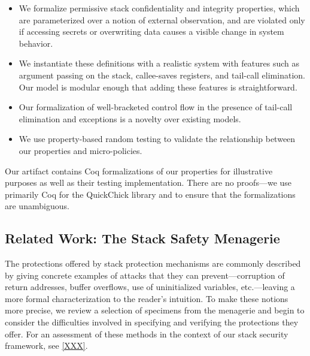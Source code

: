 \begin{itemize}
\item We formalize permissive stack confidentiality and integrity properties,
  which are parameterized over a notion of external
  observation, and are violated only if accessing secrets or overwriting
  data causes a visible change in system behavior.
\item We instantiate these definitions with a realistic
  system with features such as argument passing
  on the stack, callee-saves registers, and tail-call elimination.
  Our model is modular enough that adding these features is straightforward.
\item Our formalization of well-bracketed control flow in the presence of tail-call
  elimination \ifexceptions and exceptions \fi is a novelty over existing models.
\item We use property-based random testing to validate the relationship between
  our properties and micro-policies.
\end{itemize}

Our artifact contains Coq formalizations of our properties for illustrative purposes
as well as their testing implementation. There are no proofs---we use primarily Coq for the
QuickChick library and to ensure that the formalizations are unambiguous.

\subsection{Related Work: The Stack Safety Menagerie}


The protections offered by stack protection mechanisms are commonly described by giving
concrete examples of attacks that they can prevent---corruption of return
addresses, buffer overflows, use of uninitialized variables, etc.---leaving
a more formal characterization to the reader's intuition.
%
To make these notions more precise, we review a selection of specimens from the
menagerie and begin to consider the difficulties involved in specifying and
verifying the protections they offer.
%
For an assessment of these methods in the context of our stack security
framework, see \cref{XXX}.

